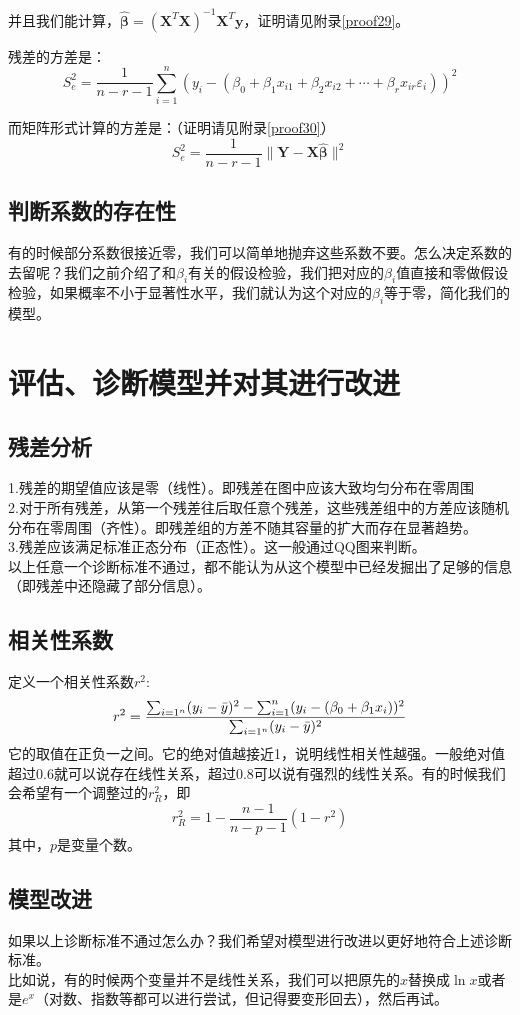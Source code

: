 \documentclass[UTF8]{ctexart}
\begin{document}
并且我们能计算，$\boldsymbol{\hat\beta}=(\boldsymbol{X}^T\boldsymbol{X})^{-1}\boldsymbol{X}^T\boldsymbol{y}$，证明请见附录\ref{proof29}。

残差的方差是：
\[
S_e^2=\frac{1}{n-r-1}\sum_{i=1}^n(y_i-(\beta_0+\beta_1x_{i1}+\beta_2x_{i2}+\cdots+\beta_rx_{ir}\varepsilon_i))^2
\]

而矩阵形式计算的方差是：（证明请见附录\ref{proof30}）
\[
	S_e^2=\frac{1}{n-r-1}\lVert\boldsymbol{Y}-\boldsymbol{X\hat\beta}\rVert^2
\]
\subsection{判断系数的存在性}
有的时候部分系数很接近零，我们可以简单地抛弃这些系数不要。怎么决定系数的去留呢？我们之前介绍了和$\beta_i$有关的假设检验，我们把对应的$\beta_i$值直接和零做假设检验，如果概率不小于显著性水平，我们就认为这个对应的$\beta_i$等于零，简化我们的模型。
\section{评估、诊断模型并对其进行改进}
\subsection{残差分析}
\noindent 1.残差的期望值应该是零（线性）。即残差在图中应该大致均匀分布在零周围\\
2.对于所有残差，从第一个残差往后取任意个残差，这些残差组中的方差应该随机分布在零周围（齐性）。即残差组的方差不随其容量的扩大而存在显著趋势。\\
3.残差应该满足标准正态分布（正态性）。这一般通过QQ图来判断。\\
以上任意一个诊断标准不通过，都不能认为从这个模型中已经发掘出了足够的信息（即残差中还隐藏了部分信息）。
\subsection{相关性系数}
定义一个相关性系数$r^2$:
\[
r^2=\frac{\sum_{i=1^n}(y_i-\Bar{y})^2-\sum_{i=1}^n(y_i-(\beta_0+\beta_1x_i))^2}{\sum_{i=1^n}(y_i-\Bar{y})^2}
\]
它的取值在正负一之间。它的绝对值越接近1，说明线性相关性越强。一般绝对值超过0.6就可以说存在线性关系，超过0.8可以说有强烈的线性关系。有的时候我们会希望有一个调整过的$r^2_R$，即
\[
r^2_R=1-\frac{n-1}{n-p-1}(1-r^2)
\]
其中，$p$是变量个数。
\subsection{模型改进}
如果以上诊断标准不通过怎么办？我们希望对模型进行改进以更好地符合上述诊断标准。\\
\indent 比如说，有的时候两个变量并不是线性关系，我们可以把原先的$x$替换成$\ln{x}$或者是$e^x$（对数、指数等都可以进行尝试，但记得要变形回去），然后再试。
\end{document}
